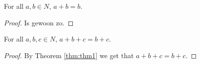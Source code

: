 %

\begin{theorem}
    \leanok
    \label{thm:thm1}
    For all $a,b \in N$, $a + b = b$.
\end{theorem}

\begin{proof} \leanok Is gewoon zo.
\end{proof}

\begin{theorem}
    \leanok
    \label{thm:thm2}
    For all $a,b,c \in N$, $a + b + c = b + c$.
\end{theorem}

\begin{proof}  \leanok By Theorem \ref{thm:thm1} we get that $a + b + c = b + c$.
\end{proof}
